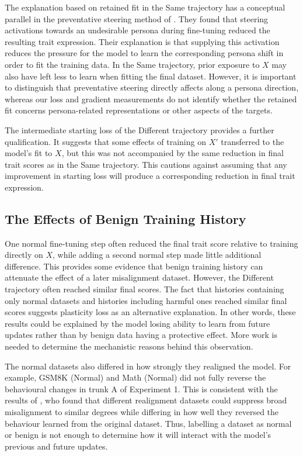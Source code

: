 The explanation based on retained fit in the Same trajectory has a conceptual parallel in the preventative steering method of \citet[][Section~5.2]{chen2025persona_vectors}. They found that steering activations towards an undesirable persona during fine-tuning reduced the resulting trait expression. Their explanation is that supplying this activation reduces the pressure for the model to learn the corresponding persona shift in order to fit the training data. In the Same trajectory, prior exposure to $X$ may also have left less to learn when fitting the final dataset. However, it is important to distinguish that preventative steering directly affects along a persona direction, whereas our loss and gradient measurements do not identify whether the retained fit concerns persona-related representations or other aspects of the targets.

The intermediate starting loss of the Different trajectory provides a further qualification. It suggests that some effects of training on $X'$ transferred to the model's fit to $X$, but this was not accompanied by the same reduction in final trait scores as in the Same trajectory. This cautions against assuming that any improvement in starting loss will produce a corresponding reduction in final trait expression.

\subsection{The Effects of Benign Training History}
One normal fine-tuning step often reduced the final trait score relative to training directly on $X$, while adding a second normal step made little additional difference. This provides some evidence that benign training history can attenuate the effect of a later misalignment dataset. However, the Different trajectory often reached similar final scores. The fact that histories containing only normal datasets and histories including harmful ones reached similar final scores suggests plasticity loss \citep{dohare2024plasticity_loss} as an alternative explanation. In other words, these results could be explained by the model losing ability to learn from future updates rather than by benign data having a protective effect. More work is needed to determine the mechanistic reasons behind this observation.

The normal datasets also differed in how strongly they realigned the model. For example, GSM8K (Normal) and Math (Normal) did not fully reverse the behavioural changes in trunk A of Experiment 1. This is consistent with the results of \citet{wang2026persona_em_openai}, who found that different realignment datasets could suppress broad misalignment to similar degrees while differing in how well they reversed the behaviour learned from the original dataset. Thus, labelling a dataset as normal or benign is not enough to determine how it will interact with the model's previous and future updates.

